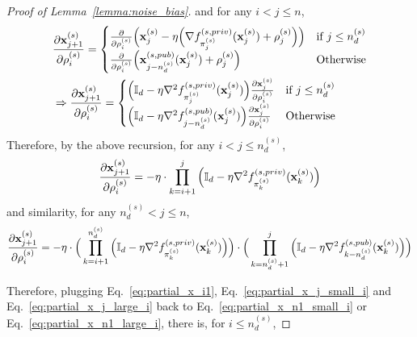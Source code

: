 \begin{proof}[Proof of Lemma~\ref{lemma:noise_bias}]
    and for any $i < j \leq n$,
    \begin{align}
        &\frac{\partial {\mathbf{x}}_{j+1}^{(s)}}{\partial \rho_i^{(s)}}
        = \begin{cases}
            \frac{\partial}{\partial \rho_i^{(s)}}\Big({\mathbf{x}}_{j}^{(s)} - \eta \Big(\nabla f_{\pi_{j}^{(s)}}^{(s, priv)}({\mathbf{x}}_{j}^{(s)}) + \rho_{j}^{(s)} \Big)
        \Big) & \text{if $j\leq n_d^{(s)}$}\\
            \frac{\partial}{\partial \rho_i^{(s)}}\Big({\mathbf{x}}_{j-n_d^{(s)}}^{(s, pub)}({\mathbf{x}}_{j}^{(s)}) + \rho_{j}^{(s)} \Big) & \text{Otherwise} 
        \end{cases}\\
        &\Rightarrow \frac{\partial {\mathbf{x}}_{j+1}^{(s)}}{\partial \rho_i^{(s)}}
        = \begin{cases}
            \Big({\mathbb{I}}_d - \eta \nabla^2 f_{\pi_{j}^{(s)}}^{(s, priv)}({\mathbf{x}}_{j}^{(s)})\Big) \frac{\partial {\mathbf{x}}_{j}^{(s)}}{\partial \rho_i^{(s)}} & \text{if $j \leq n_d^{(s)}$}\\
            \Big( {\mathbb{I}}_d - \eta \nabla^2 f_{j-n_d^{(s)}}^{(s,pub)}({\mathbf{x}}_{j}^{(s)})\Big)\frac{\partial {\mathbf{x}}_{j}^{(s)}}{\partial \rho_i^{(s)}} & \text{Otherwise}
        \end{cases}
    \end{align}
    Therefore, by the above recursion, for any $i < j \leq n_d^{(s)}$,
    \begin{align}
    \label{eq:partial_x_j_small_i}
        \frac{\partial {\mathbf{x}}_{j+1}^{(s)}}{\partial \rho_i^{(s)}}
        = -\eta \cdot \prod_{k=i+1}^{j}\Big( {\mathbb{I}}_d - \eta \nabla^2 f_{\pi_{k}^{(s)}}^{(s,priv)}({\mathbf{x}}_{k}^{(s)})\Big) 
    \end{align}
    and similarity, for any $n_d^{(s)} < j \leq n$,
    \begin{align}
    \label{eq:partial_x_j_large_i}
        \frac{\partial {\mathbf{x}}_{j+1}^{(s)}}{\partial \rho_i^{(s)}}
        = -\eta \cdot \Big(\prod_{k=i+1}^{n_d^{(s)}}\Big({\mathbb{I}}_d - \eta \nabla^2 f_{\pi_{k}^{(s)}}^{(s,priv)}({\mathbf{x}}_{k}^{(s)})\Big)
        \Big)\cdot \Big(\prod_{k=n_d^{(s)}+1}^{j} \Big({\mathbb{I}}_d - \eta \nabla^2 f_{k-n_d^{(s)}}^{(s,pub)}({\mathbf{x}}_{k}^{(s)}) \Big) \Big)
    \end{align}
    
    
    Therefore, plugging Eq.~\ref{eq:partial_x_i1}, Eq.~\ref{eq:partial_x_j_small_i} and Eq.~\ref{eq:partial_x_j_large_i} back to Eq.~\ref{eq:partial_x_n1_small_i} or Eq.~\ref{eq:partial_x_n1_large_i}, there is, for $i \leq n_d^{(s)}$,


\end{proof}
